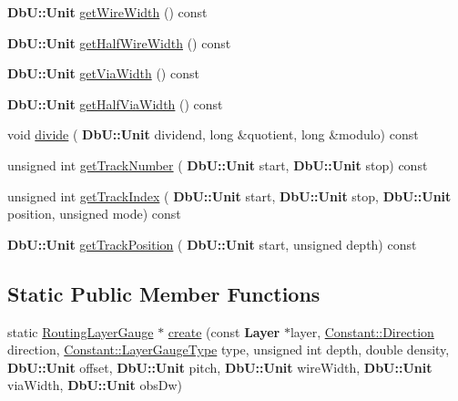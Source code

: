 \begin{DoxyCompactItemize}
\item 
\textbf{ Db\+U\+::\+Unit} \mbox{\hyperlink{classCRL_1_1RoutingLayerGauge_ab29fa7895f4fe661eb85bed9f6a5860e}{get\+Wire\+Width}} () const
\item 
\textbf{ Db\+U\+::\+Unit} \mbox{\hyperlink{classCRL_1_1RoutingLayerGauge_a57183085c39be7edcb87f4f770f8e535}{get\+Half\+Wire\+Width}} () const
\item 
\textbf{ Db\+U\+::\+Unit} \mbox{\hyperlink{classCRL_1_1RoutingLayerGauge_ac0783d29a7f9f6a2f02ac72f3196d637}{get\+Via\+Width}} () const
\item 
\textbf{ Db\+U\+::\+Unit} \mbox{\hyperlink{classCRL_1_1RoutingLayerGauge_a0f090ea25ef6f88e691fc6e572f79e16}{get\+Half\+Via\+Width}} () const
\item 
void \mbox{\hyperlink{classCRL_1_1RoutingLayerGauge_ab8d5ae22c453605226b2695c2568c4f5}{divide}} (\textbf{ Db\+U\+::\+Unit} dividend, long \&quotient, long \&modulo) const
\item 
unsigned int \mbox{\hyperlink{classCRL_1_1RoutingLayerGauge_ab9bbb7959ca58438d59709398044daae}{get\+Track\+Number}} (\textbf{ Db\+U\+::\+Unit} start, \textbf{ Db\+U\+::\+Unit} stop) const
\item 
unsigned int \mbox{\hyperlink{classCRL_1_1RoutingLayerGauge_ad61cdf130c8b739bb44a01cfd5968022}{get\+Track\+Index}} (\textbf{ Db\+U\+::\+Unit} start, \textbf{ Db\+U\+::\+Unit} stop, \textbf{ Db\+U\+::\+Unit} position, unsigned mode) const
\item 
\textbf{ Db\+U\+::\+Unit} \mbox{\hyperlink{classCRL_1_1RoutingLayerGauge_a470828019c5cde566e7aa6d27ef68439}{get\+Track\+Position}} (\textbf{ Db\+U\+::\+Unit} start, unsigned depth) const
\end{DoxyCompactItemize}
\subsection*{Static Public Member Functions}
\begin{DoxyCompactItemize}
\item 
static \mbox{\hyperlink{classCRL_1_1RoutingLayerGauge}{Routing\+Layer\+Gauge}} $\ast$ \mbox{\hyperlink{classCRL_1_1RoutingLayerGauge_afe17db013bf6a933c2af4e847bfd7918}{create}} (const \textbf{ Layer} $\ast$layer, \mbox{\hyperlink{namespaceConstant_ac081a99f2b64361919ed5d9f37c0f9af}{Constant\+::\+Direction}} direction, \mbox{\hyperlink{namespaceConstant_ab2e46a17cc373a268c5c24fa0e2067e5}{Constant\+::\+Layer\+Gauge\+Type}} type, unsigned int depth, double density, \textbf{ Db\+U\+::\+Unit} offset, \textbf{ Db\+U\+::\+Unit} pitch, \textbf{ Db\+U\+::\+Unit} wire\+Width, \textbf{ Db\+U\+::\+Unit} via\+Width, \textbf{ Db\+U\+::\+Unit} obs\+Dw)
\end{DoxyCompactItemize}


